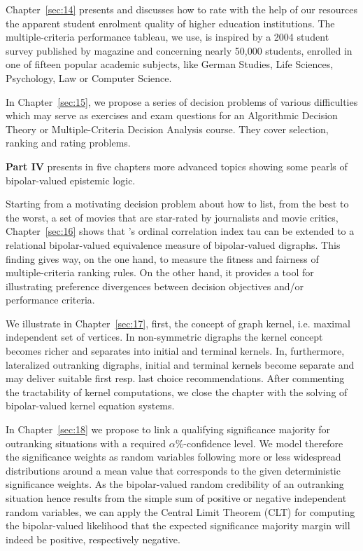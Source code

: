 Chapter~\ref{sec:14} presents and discusses how to rate with the help of our \Digraph resources the apparent student enrolment quality of higher education institutions. The multiple-criteria performance tableau, we use, is inspired by a 2004 student survey published by \Spiegel magazine and concerning nearly 50,000 students, enrolled in one of fifteen popular academic subjects, like German Studies, Life Sciences, Psychology, Law or Computer Science.

In Chapter~\ref{sec:15}, we propose a series of decision problems of various difficulties which may serve as exercises and exam questions for an Algorithmic Decision Theory or Multiple-Criteria Decision Analysis course. They cover selection, ranking and rating problems.
\vspace{5pt}

\textbf{Part IV} presents in five chapters more advanced topics showing some pearls of bipolar-valued epistemic logic.

Starting from a motivating decision problem about how to list, from the best to the worst, a set of movies that are star-rated by journalists and movie critics, Chapter~\ref{sec:16} shows that \Kendall’s ordinal correlation index tau can be extended to a relational bipolar-valued equivalence measure of bipolar-valued digraphs. This finding gives way, on the one hand, to measure the fitness and fairness of multiple-criteria ranking rules. On the other hand, it provides a tool for illustrating preference divergences between decision objectives and/or performance criteria.

We illustrate in Chapter~\ref{sec:17}, first, the concept of graph kernel, i.e. maximal independent set of vertices. In non-symmetric digraphs the kernel concept becomes richer and separates into initial and terminal kernels. In, furthermore, lateralized outranking digraphs, initial and terminal kernels become separate and may deliver suitable first resp. last choice recommendations. After commenting the tractability of kernel computations, we close the chapter with the solving of bipolar-valued kernel equation systems.

In Chapter~\ref{sec:18} we propose to link a qualifying significance majority for outranking situations with a required $\alpha\%$-confidence level. We model therefore the significance weights as random variables following more or less widespread distributions around a mean value that corresponds to the given deterministic significance weights. As the bipolar-valued random credibility of an outranking situation hence results from the simple sum of positive or negative independent random variables, we can apply the Central Limit Theorem (CLT) for computing the bipolar-valued likelihood that the expected significance majority margin will indeed be positive, respectively negative.

